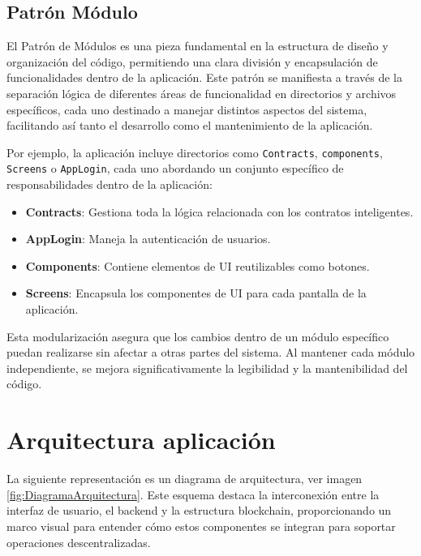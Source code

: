 \subsection{Patrón Módulo}

El Patrón de Módulos es una pieza fundamental en la estructura de diseño y organización del código, permitiendo una clara división y encapsulación de funcionalidades dentro de la aplicación. Este patrón se manifiesta a través de la separación lógica de diferentes áreas de funcionalidad en directorios y archivos específicos, cada uno destinado a manejar distintos aspectos del sistema, facilitando así tanto el desarrollo como el mantenimiento de la aplicación.

Por ejemplo, la aplicación incluye directorios como \texttt{Contracts}, \texttt{components}, \texttt{Screens} o \texttt{AppLogin}, cada uno abordando un conjunto específico de responsabilidades dentro de la aplicación:

\begin{itemize}
\item \textbf{Contracts}: Gestiona toda la lógica relacionada con los contratos inteligentes.

\item \textbf{AppLogin}: Maneja la autenticación de usuarios.

\item \textbf{Components}: Contiene elementos de UI reutilizables como botones.

\item \textbf{Screens}: Encapsula los componentes de UI para cada pantalla de la aplicación.
\end{itemize}

Esta modularización asegura que los cambios dentro de un módulo específico puedan realizarse sin afectar a otras partes del sistema. Al mantener cada módulo independiente, se mejora significativamente la legibilidad y la mantenibilidad del código.


\section{Arquitectura aplicación}

La siguiente representación es un diagrama de arquitectura, ver imagen \ref{fig:DiagramaArquitectura}. Este esquema destaca la interconexión entre la interfaz de usuario, el backend y la estructura blockchain, proporcionando un marco visual para entender cómo estos componentes se integran para soportar operaciones descentralizadas.

